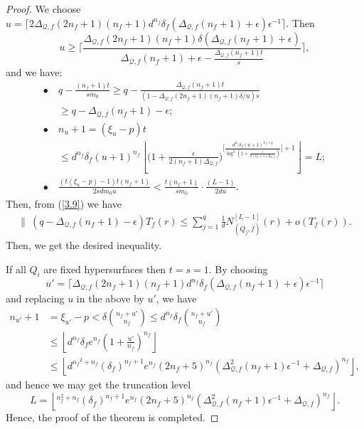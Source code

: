 \documentclass[12pt,leqno]{amsart}
\numberwithin{equation}{section}
\begin{document}
\begin{proof}
\noindent
We choose $u=\lceil 2\Delta_{\mathcal Q,f}(2n_f+1)(n_f+1)d^{n_f}\delta_f(\Delta_{\mathcal Q,f}(n_f+1)+\epsilon)\epsilon^{-1}\rceil$. 
Then 
$$u\ge \biggl\lceil \dfrac{\Delta_{\mathcal Q,f}(2n_f+1)(n_f+1)\delta(\Delta_{\mathcal Q,f}(n_f+1)+\epsilon)}{\Delta_{\mathcal Q,f}(n_f+1)+\epsilon-\frac{\Delta_{\mathcal Q,f}(n_f+1)t}{s}}\biggl\rceil,$$ 
and we have:
\begin{align*}
\bullet\ &q-\frac{(n_f+1)t}{sm_0}\ge q-\frac{\Delta_{\mathcal Q,f}(n_f+1)t}{(1-\Delta_{\mathcal Q,f}(2n_f+1)(n_f+1)\delta/u)s}\\
&\ge q-\Delta_{\mathcal Q,f}(n_f+1)-\epsilon;\\
\bullet\ &n_u+1=(\xi_u-p)t\\
&\le  d^{n_f}\delta_f(u+1)^{n_f}\left\lfloor\bigl(1+\frac{\epsilon}{2(n_f+1)\Delta_{\mathcal Q,f}}\bigl)^{\bigl[\frac{d^{n_f}\delta_f(u+1)^{n_f+q}}{\log^2(1+\frac{\epsilon}{2(n_f+1)\Delta_{\mathcal Q,f}})}\bigl]+1}\right\rfloor=L;\\
\bullet\ &\frac{(t(\xi_u-p)-1)t(n_f+1)}{2sdm_0u}< \frac{t(n_f+1)}{sm_0}\cdot\frac{(L-1)}{2du}.
\end{align*}
Then, from (\ref{3.9}) we have
\begin{align*}
\bigl\|\ (q-\Delta_{\mathcal Q,f}(n_f+1)-\epsilon)T_f(r)\le\sum_{j=1}^{q}\frac{1}{d}N^{[L-1]}_{(Q_j,f)}(r)+o(T_f (r)).
\end{align*}
Then, we get the desired inequality.
 

If all $Q_i$ are fixed hypersurfaces then $t=s=1$. By choosing 
$$u'=\lceil \Delta_{\mathcal Q,f}(2n_f+1)(n_f+1)d^{n_f}\delta_f(\Delta_{\mathcal Q,f}(n_f+1)+\epsilon)\epsilon^{-1}\rceil$$ 
and replacing $u$ in the above by $u'$, we have
\begin{align*}
n_{u'}+1&=\xi_{u'}-p<\delta\binom{n_f+u'}{n_f}\le d^{n_f}\delta_f\binom{n_f+u'}{n_f}\\
&\le \left\lfloor d^{n_f}\delta_fe^{n_f}\left(1+\frac{u'}{n_f}\right)^{n_f}\right\rfloor\\
&\le \left\lfloor d^{{n_f}^2+n_f}(\delta_f)^{n_f+1}e^{n_f}(2n_f+5)^{n_f}(\Delta^2_{\mathcal Q,f}(n_f+1)\epsilon^{-1}+\Delta_{\mathcal Q,f})^{n_f}\right\rfloor,
\end{align*}
and hence we may get the truncation level
$$ L=\left\lfloor^{n_f^2+n_f}(\delta_f)^{n_f+1}e^{n_f}(2n_f+5)^{n_f}(\Delta^2_{\mathcal Q,f}(n_f+1)\epsilon^{-1}+\Delta_{\mathcal Q,f})^{n_f}\right\rfloor.$$
Hence, the proof of the theorem is completed.
\end{proof}
\end{document}
